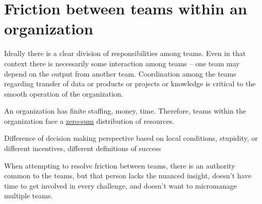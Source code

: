 \section{Friction between teams within an organization}

Ideally there is a clear division of responsibilities among teams. Even in that context there is necessarily some interaction among teams -- one team may depend on the output from another team. Coordination among the teams regarding transfer of data or products or projects or knowledge is critical to the smooth operation of the organization. 

An organization has finite staffing, money, time. Therefore, teams within the organization face a \href{https://en.wikipedia.org/wiki/Zero-sum_game}{zero-sum}
distribution of resources.

Difference of decision making perspective based on local conditions, stupidity, or different incentives, different definitions of success

When attempting to resolve friction between teams, there is an authority common to the teams, but that person lacks the nuanced insight, doesn't have time to get involved in every challenge, and doesn't want to micromanage multiple teams.